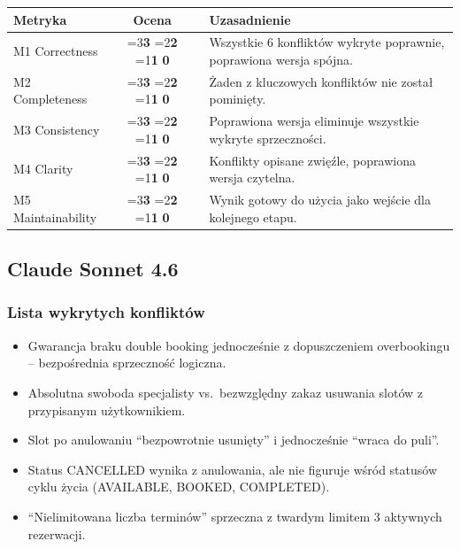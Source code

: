 \documentclass[12pt,a4paper]{article}
\newcommand{\scorebox}[1]{%
  \ifnum#1=3\colorbox{score3}{\textbf{3}}%
  \else\ifnum#1=2\colorbox{score2}{\textbf{2}}%
  \else\ifnum#1=1\colorbox{score1}{\textbf{1}}%
  \else\colorbox{score0}{\textbf{0}}\fi\fi\fi
}
\begin{document}
\vspace{0.5em}
\begin{tabular}{lccl}
\toprule
\textbf{Metryka} & \textbf{Ocena} & & \textbf{Uzasadnienie} \\
\midrule
M1 Correctness    & \scorebox{3} && Wszystkie 6 konfliktów wykryte poprawnie, poprawiona wersja spójna. \\
M2 Completeness   & \scorebox{3} && Żaden z kluczowych konfliktów nie został pominięty. \\
M3 Consistency    & \scorebox{3} && Poprawiona wersja eliminuje wszystkie wykryte sprzeczności. \\
M4 Clarity        & \scorebox{3} && Konflikty opisane zwięźle, poprawiona wersja czytelna. \\
M5 Maintainability & \scorebox{3} && Wynik gotowy do użycia jako wejście dla kolejnego etapu. \\
\bottomrule
\end{tabular}

\vspace{1.5em}

\subsection{\textcolor{claudecolor}{Claude Sonnet 4.6} }

\subsubsection{Lista wykrytych konfliktów}
\begin{itemize}[leftmargin=1.5em, itemsep=2pt]
  \item Gwarancja braku double booking jednocześnie z dopuszczeniem overbookingu -- bezpośrednia sprzeczność logiczna.
  \item Absolutna swoboda specjalisty vs.\ bezwzględny zakaz usuwania slotów z przypisanym użytkownikiem.
  \item Slot po anulowaniu ``bezpowrotnie usunięty'' i jednocześnie ``wraca do puli''.
  \item Status CANCELLED wynika z anulowania, ale nie figuruje wśród statusów cyklu życia (AVAILABLE, BOOKED, COMPLETED).
  \item ``Nielimitowana liczba terminów'' sprzeczna z twardym limitem 3 aktywnych rezerwacji.
\end{itemize}
\end{document}
